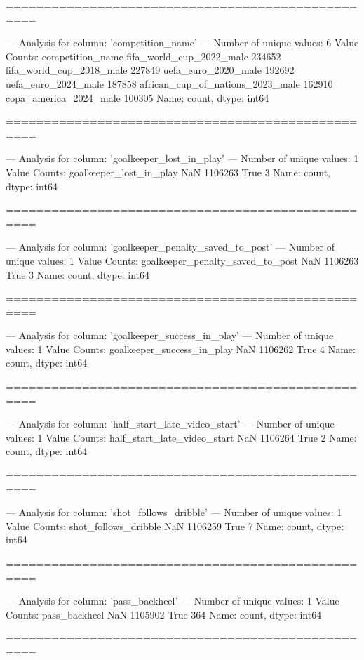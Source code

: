 ==================================================

--- Analysis for column: 'competition_name' ---
Number of unique values: 6
Value Counts:
competition_name
fifa_world_cup_2022_male            234652
fifa_world_cup_2018_male            227849
uefa_euro_2020_male                 192692
uefa_euro_2024_male                 187858
african_cup_of_nations_2023_male    162910
copa_america_2024_male              100305
Name: count, dtype: int64

==================================================

--- Analysis for column: 'goalkeeper_lost_in_play' ---
Number of unique values: 1
Value Counts:
goalkeeper_lost_in_play
NaN     1106263
True          3
Name: count, dtype: int64

==================================================

--- Analysis for column: 'goalkeeper_penalty_saved_to_post' ---
Number of unique values: 1
Value Counts:
goalkeeper_penalty_saved_to_post
NaN     1106263
True          3
Name: count, dtype: int64

==================================================

--- Analysis for column: 'goalkeeper_success_in_play' ---
Number of unique values: 1
Value Counts:
goalkeeper_success_in_play
NaN     1106262
True          4
Name: count, dtype: int64

==================================================

--- Analysis for column: 'half_start_late_video_start' ---
Number of unique values: 1
Value Counts:
half_start_late_video_start
NaN     1106264
True          2
Name: count, dtype: int64

==================================================

--- Analysis for column: 'shot_follows_dribble' ---
Number of unique values: 1
Value Counts:
shot_follows_dribble
NaN     1106259
True          7
Name: count, dtype: int64

==================================================

--- Analysis for column: 'pass_backheel' ---
Number of unique values: 1
Value Counts:
pass_backheel
NaN     1105902
True        364
Name: count, dtype: int64

==================================================